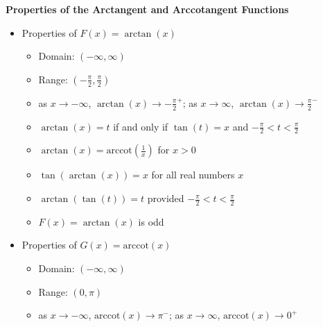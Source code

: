 \smallskip


\colorbox{ResultColor}{\bbm

\begin{thm} \label{arctangentcotangentfunctionprops}  \textbf{Properties of the Arctangent and Arccotangent Functions}     

\begin{itemize}

\item Properties of $F(x)= \arctan(x)$

\begin{itemize}

\item Domain: $(-\infty, \infty)$

\item Range: $\left(-\frac{\pi}{2}, \frac{\pi}{2}\right)$

\item  as $x \rightarrow -\infty$, $\arctan(x) \rightarrow -\frac{\pi}{2}^{+}$;  as $x \rightarrow \infty$, $\arctan(x) \rightarrow \frac{\pi}{2}^{-}$

\item  $\arctan(x) = t$ if and only if $\tan(t) = x$ and $-\frac{\pi}{2} < t < \frac{\pi}{2}$ 

\item  $\arctan(x) = \mbox{arccot}\left(\frac{1}{x}\right)$ for $x > 0$

\item  $\tan\left(\arctan(x)\right) = x$ for all real numbers $x$

\item  $\arctan(\tan(t)) = t$ provided $-\frac{\pi}{2} < t < \frac{\pi}{2}$

\item $F(x)= \arctan(x)$ is odd

\end{itemize}

\item Properties of $G(x) = \mbox{arccot}(x)$

\begin{itemize}

\item Domain: $(-\infty, \infty)$

\item Range: $(0, \pi)$

\item  as $x \rightarrow -\infty$, $\mbox{arccot}(x) \rightarrow \pi^{-}$; as $x \rightarrow \infty$, $\mbox{arccot}(x) \rightarrow 0^{+}$


\end{itemize}
\end{itemize}
\end{thm}}
